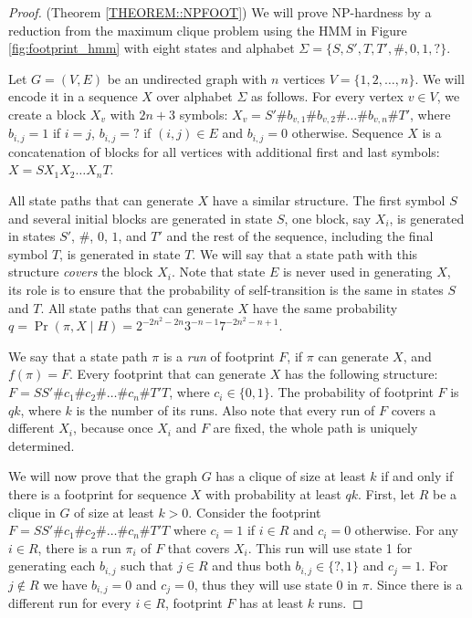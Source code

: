 \begin{proof}(Theorem \ref{THEOREM::NPFOOT})
We will prove NP-hardness by a reduction from the maximum clique problem
using the HMM in Figure 
\ref{fig:footprint_hmm} with eight states and
alphabet $\Sigma=\{S,S',T,T',\#,0,1,?\}$. 

Let $G=(V,E)$ be an undirected graph with $n$ vertices $V=\{1,2,\dots,n\}$. We
will encode it in a sequence $X$ over alphabet $\Sigma$ as follows.  For every
vertex $v\in V$, we create a block $X_v$ with $2n+3$ symbols:
$X_v=S'\#b_{v,1}\#b_{v,2}\#\dots\#b_{v,n}\#T'$, where $b_{i,j}=1$ if $i=j$,
$b_{i,j}=?$ if $(i,j)\in E$ and $b_{i,j}=0$ otherwise.  Sequence $X$ is a
concatenation of blocks for all vertices with additional first and last symbols:
$X=SX_1X_2\dots X_nT$.

All state paths that can generate $X$ have a similar structure. The first
symbol $S$ and several initial blocks are generated in state $S$, one
block, say $X_i$, is generated in states $S'$, $\#$, $0$, $1$, and
$T'$ and the rest of the sequence, including the final symbol $T$, is
generated in state $T$. We will say that a state path with this
structure \emph{covers} the block $X_i$.  Note that state $E$ is never used in
generating $X$, its role is to ensure that the probability of
self-transition is the same in states $S$ and $T$.
All state paths that can generate $X$ have the same
probability $q = \Pr(\pi,X\mid H) = 2^{-2n^2-2n}3^{-n-1}7^{-2n^2-n+1}$.

%


We say that a state path $\pi$ is a \emph{run} of footprint $F$, if
$\pi$ can generate $X$, and $f(\pi)=F$.
Every footprint that can generate $X$ has the following structure:
$F=SS'\#c_1\#c_2\#\dots\#c_n\#T'T$, where $c_i\in\{0,1\}$. 
The probability of footprint $F$ is $qk$, where $k$ is the number of its runs.
Also note that every run of $F$ covers a different $X_i$, because once $X_i$
and $F$ are fixed, the whole path is uniquely determined. 

We will now prove that the graph $G$ has a clique of size at least $k$
if and only if there is a footprint for sequence $X$ with
probability at least $qk$.  First, let $R$ be a clique in $G$ of size
at least $k>0$.  Consider the footprint
$F=SS'\#c_1\#c_2\#\dots\#c_n\#T'T$ where $c_i=1$ if $i\in R$ and $c_i=0$
otherwise. For any $i\in R$, there is a run $\pi_i$ of $F$ that covers
$X_i$. This run will use state 1 for generating each $b_{i,j}$ such
that $j\in R$ and thus both $b_{i,j}\in \{?,1\}$ and $c_j=1$.  For
$j\notin R$ we have $b_{i,j}=0$ and $c_j=0$, thus they will use state
0 in $\pi$. Since there is a different run for every $i\in R$, footprint 
$F$ has at least $k$ runs.




\end{proof}
